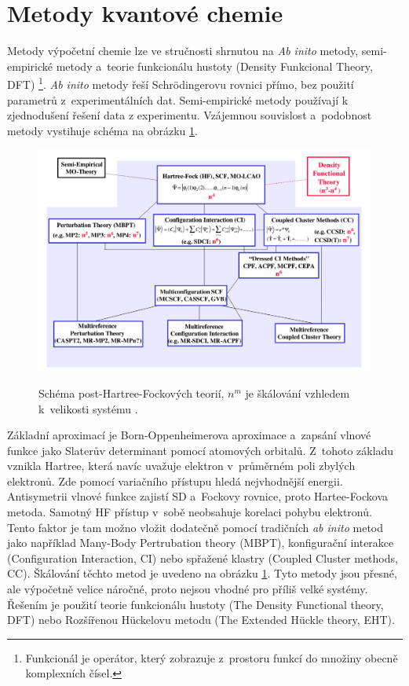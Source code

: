 \documentclass[
  printed, %
  table,   %
  lof,     %
  lot,     %
  oneside,
]{fithesis3}
\begin{document}
\section{Metody kvantové chemie}
Metody výpočetní chemie lze ve stručnosti shrnutou na \textit{Ab inito} metody, semi-empirické metody a~teorie funkcionálu hustoty (Density Funkcional Theory, DFT) \footnote{Funkcionál je operátor, který zobrazuje z~prostoru funkcí do množiny obecně komplexních čísel.}. \textit{Ab inito} metody řeší Schrödingerovu rovnici přímo, bez použití parametrů z~experimentálních dat. Semi-empirické metody používají k zjednodušení řešení data z experimentu. Vzájemnou souvislost a~podobnost metody vystihuje schéma na obrázku \ref{schema_QM}.
 \begin{figure}[h]
\caption{Schéma post-Hartree-Fockových teorií, $n^m$ je škálování vzhledem k~velikosti systému \cite{pdf_obrazek}. }
  \center
  \includegraphics[width=12cm]{schema_QM.png}
  \label{schema_QM}
  \end{figure}
     Základní aproximací je Born-Oppenheimerova aproximace a~zapsání vlnové funkce jako Slaterův determinant pomocí atomových orbitalů. Z~tohoto základu vznikla Hartree, která navíc uvažuje elektron v~průměrném poli zbylých elektronů. Zde pomocí variačního přístupu hledá nejvhodnější energii. Antisymetrii vlnové funkce zajistí SD a~Fockovy rovnice, proto Hartee-Fockova metoda. Samotný HF přístup v~sobě neobsahuje korelaci pohybu elektronů. Tento faktor je tam možno vložit dodatečně pomocí tradičních \textit{ab inito} metod jako například Many-Body Pertrubation  theory (MBPT), konfigurační interakce (Configuration Interaction, CI) nebo spřažené klastry (Coupled Cluster methods, CC). Škálování těchto metod je uvedeno na obrázku \ref{schema_QM}. Tyto metody jsou přesné, ale výpočetně velice náročné, proto nejsou vhodné pro příliš velké systémy. Řešením je použití teorie funkcionálu hustoty (The Density Functional theory, DFT) nebo Rozšířenou Hückelovu metodu (The Extended Hückle theory, EHT).
\end{document}
